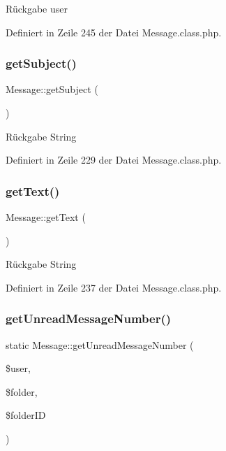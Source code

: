 \begin{DoxyReturn}{Rückgabe}
user 
\end{DoxyReturn}


Definiert in Zeile 245 der Datei Message.\+class.\+php.

\mbox{\label{class_message_a8ed9678719cd091d87f5bb12e48183f5}} 
\subsubsection{\texorpdfstring{get\+Subject()}{getSubject()}}
{\footnotesize\ttfamily Message\+::get\+Subject (\begin{DoxyParamCaption}{ }\end{DoxyParamCaption})}

\begin{DoxyReturn}{Rückgabe}
String 
\end{DoxyReturn}


Definiert in Zeile 229 der Datei Message.\+class.\+php.

\mbox{\label{class_message_a49ae811f5b2ea3c6ada0c46696672964}} 
\subsubsection{\texorpdfstring{get\+Text()}{getText()}}
{\footnotesize\ttfamily Message\+::get\+Text (\begin{DoxyParamCaption}{ }\end{DoxyParamCaption})}

\begin{DoxyReturn}{Rückgabe}
String 
\end{DoxyReturn}


Definiert in Zeile 237 der Datei Message.\+class.\+php.

\mbox{\label{class_message_a2f4a908e9cb2bab9cedf822e5239f9d0}} 
\subsubsection{\texorpdfstring{get\+Unread\+Message\+Number()}{getUnreadMessageNumber()}}
{\footnotesize\ttfamily static Message\+::get\+Unread\+Message\+Number (\begin{DoxyParamCaption}\item[{}]{\$user,  }\item[{}]{\$folder,  }\item[{}]{\$folder\+ID }\end{DoxyParamCaption})\hspace{0.3cm}{\ttfamily [static]}}


